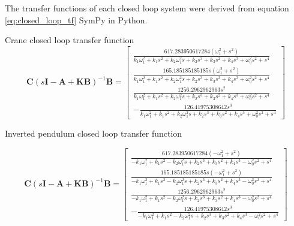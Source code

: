 \documentclass{article}
\begin{document}
The transfer functions of each closed loop system were derived from equation \ref{eq:closed_loop_tf} SymPy in Python.

Crane closed loop transfer function
\begin{equation}
  \mathbf{C} (s\mathbf{I} - \mathbf{A} + \mathbf{KB}) ^{-1} \mathbf{B} = \left[\begin{matrix}\frac{617.283950617284 \left(\omega_{1}^{2} + s^{2}\right)}{k_{1} \omega_{1}^{2} + k_{1} s^{2} + k_{2} \omega_{1}^{2} s + k_{2} s^{3} + k_{3} s^{2} + k_{4} s^{3} + \omega_{0}^{2} s^{2} + s^{4}}\\\frac{165.185185185185 s \left(\omega_{1}^{2} + s^{2}\right)}{k_{1} \omega_{1}^{2} + k_{1} s^{2} + k_{2} \omega_{1}^{2} s + k_{2} s^{3} + k_{3} s^{2} + k_{4} s^{3} + \omega_{0}^{2} s^{2} + s^{4}}\\\frac{1256.2962962963 s^{2}}{k_{1} \omega_{1}^{2} + k_{1} s^{2} + k_{2} \omega_{1}^{2} s + k_{2} s^{3} + k_{3} s^{2} + k_{4} s^{3} + \omega_{0}^{2} s^{2} + s^{4}}\\- \frac{126.41975308642 s^{3}}{k_{1} \omega_{1}^{2} + k_{1} s^{2} + k_{2} \omega_{1}^{2} s + k_{2} s^{3} + k_{3} s^{2} + k_{4} s^{3} + \omega_{0}^{2} s^{2} + s^{4}}\end{matrix}\right]
\end{equation}

Inverted pendulum closed loop transfer function

\begin{equation}
  \mathbf{C} (s\mathbf{I} - \mathbf{A} + \mathbf{KB}) ^{-1} \mathbf{B} = \left[\begin{matrix}\frac{617.283950617284 \left(- \omega_{1}^{2} + s^{2}\right)}{- k_{1} \omega_{1}^{2} + k_{1} s^{2} - k_{2} \omega_{1}^{2} s + k_{2} s^{3} + k_{3} s^{2} + k_{4} s^{3} - \omega_{0}^{2} s^{2} + s^{4}}\\\frac{165.185185185185 s \left(- \omega_{1}^{2} + s^{2}\right)}{- k_{1} \omega_{1}^{2} + k_{1} s^{2} - k_{2} \omega_{1}^{2} s + k_{2} s^{3} + k_{3} s^{2} + k_{4} s^{3} - \omega_{0}^{2} s^{2} + s^{4}}\\\frac{1256.2962962963 s^{2}}{- k_{1} \omega_{1}^{2} + k_{1} s^{2} - k_{2} \omega_{1}^{2} s + k_{2} s^{3} + k_{3} s^{2} + k_{4} s^{3} - \omega_{0}^{2} s^{2} + s^{4}}\\- \frac{126.41975308642 s^{3}}{- k_{1} \omega_{1}^{2} + k_{1} s^{2} - k_{2} \omega_{1}^{2} s + k_{2} s^{3} + k_{3} s^{2} + k_{4} s^{3} - \omega_{0}^{2} s^{2} + s^{4}}\end{matrix}\right]
\end{equation}
\end{document}
